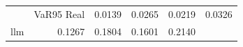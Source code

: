 \begin{tabular}{lrrrr}
\toprule
 & VaR95%
\midrule
Real & 0.0139 & 0.0265 & 0.0219 & 0.0326 \\
llm & 0.1267 & 0.1804 & 0.1601 & 0.2140 \\
\bottomrule
\end{tabular}
